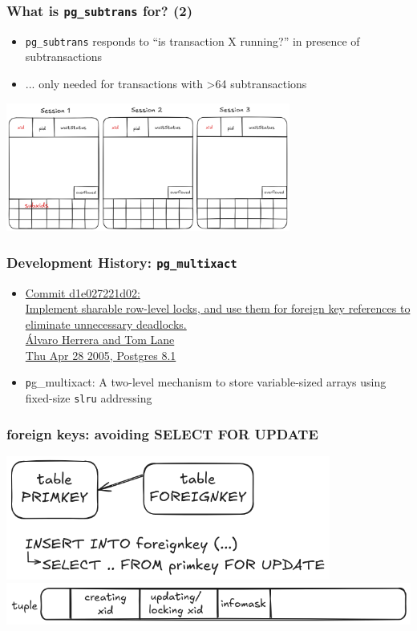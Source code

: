 \begin{frame}
  \frametitle{What is \texttt{pg\_subtrans} for? (2)}
  \begin{itemize}
    \item \texttt{pg\_subtrans} responds to ``is transaction X running?'' in presence of subtransactions
    \item ... only needed for transactions with >64 subtransactions
  \end{itemize}
  \center \includegraphics[width=0.7\textwidth]{pgproc-with-subxids.png}
\end{frame}

\begin{frame}
  \frametitle{Development History: \texttt{pg\_multixact}}
   \begin{itemize}
      \item {\linksize \href{https://git.postgresql.org/cgit/postgresql.git/commit/?id=d1e027221d0243b7b57eabb0e482923dd7d1c8eb}
	{Commit d1e027221d02: \faExternalLink \\
	Implement sharable row-level locks, and use them for foreign key references to eliminate unnecessary deadlocks. \\
	Álvaro Herrera and Tom Lane \\
	Thu Apr 28 2005, Postgres 8.1}}
      \item {\texttt pg\_multixact}: A two-level mechanism to store
	variable-sized arrays using fixed-size \texttt{slru} addressing
   \end{itemize}
\end{frame}

\begin{frame}
  \frametitle{foreign keys: avoiding SELECT FOR UPDATE}
  \includegraphics[width=0.8\textwidth]{select-for-update.png}
  \vspace{0.7cm}
  \includegraphics[width=\textwidth]{tuple.png}
\end{frame}

